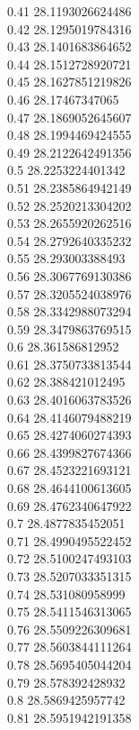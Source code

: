 {0.41	28.1193026624486\\
0.42	28.1295019784316\\
0.43	28.1401683864652\\
0.44	28.1512728920721\\
0.45	28.1627851219826\\
0.46	28.17467347065\\
0.47	28.1869052645607\\
0.48	28.1994469424555\\
0.49	28.2122642491356\\
0.5	28.2253224401342\\
0.51	28.2385864942149\\
0.52	28.2520213304202\\
0.53	28.2655920262516\\
0.54	28.2792640335232\\
0.55	28.293003388493\\
0.56	28.3067769130386\\
0.57	28.3205524038976\\
0.58	28.3342988073294\\
0.59	28.3479863769515\\
0.6	28.361586812952\\
0.61	28.3750733813544\\
0.62	28.388421012495\\
0.63	28.4016063783526\\
0.64	28.4146079488219\\
0.65	28.4274060274393\\
0.66	28.4399827674366\\
0.67	28.4523221693121\\
0.68	28.4644100613605\\
0.69	28.4762340647922\\
0.7	28.4877835452051\\
0.71	28.4990495522452\\
0.72	28.5100247493103\\
0.73	28.5207033351315\\
0.74	28.531080958999\\
0.75	28.5411546313065\\
0.76	28.5509226309681\\
0.77	28.5603844111264\\
0.78	28.5695405044204\\
0.79	28.578392428932\\
0.8	28.5869425957742\\
0.81	28.5951942191358\\
}
